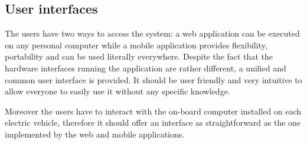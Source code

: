 \subsection{User interfaces}
The users have two ways to access the system: a web application can be executed on any personal computer while a mobile application provides flexibility, portability and can be used literally everywhere. Despite the fact that the hardware interfaces running the application are rather different, a unified and common user interface is provided. It should be user friendly and very intuitive to allow everyone to easily use it without any specific knowledge.

Moreover the users have to interact with the on-board computer installed on each electric vehicle, therefore it should offer an interface as straightforward as the one implemented by the web and mobile applications.
